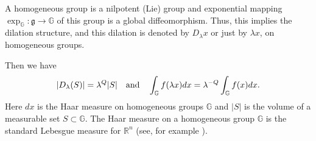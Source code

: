 \documentclass[a4paper,12pt,reqno]{amsart}
\numberwithin{equation}{section}
\theoremstyle{plain}
\theoremstyle{definition}
\newcommand{\Rn}{\mathbb R^{n}}
\begin{document}
A homogeneous group is a nilpotent (Lie) group and exponential mapping $\exp_{\mathbb G}:\mathfrak g\to\mathbb G$ of this group is a global diffeomorphism.
Thus, this implies the dilation structure, and this dilation is denoted by $D_{\lambda}x$ or just by $\lambda x$, on homogeneous groups.

Then we have
\begin{equation}
|D_{\lambda}(S)|=\lambda^{Q}|S| \quad {\rm and}\quad \int_{\mathbb{G}}f(\lambda x)
dx=\lambda^{-Q}\int_{\mathbb{G}}f(x)dx.
\end{equation}
Here $dx$ is the Haar measure on homogeneous groups $\mathbb{G}$ and $|S|$ is the volume of a measurable set $S\subset \mathbb{G}$. The Haar measure on a homogeneous group $\mathbb{G}$ is the standard Lebesgue measure for $\Rn$ (see, for example \cite[Proposition 1.6.6]{FR}).
\end{document}
